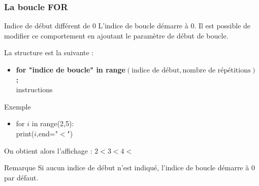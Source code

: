 \documentclass[8pt]{beamer}
\begin{document}
\begin{frame}
\frametitle{La boucle FOR}

\begin{block}{Indice de début différent de $0$}
L'indice de boucle démarre à 0. Il est possible de modifier ce comportement en ajoutant le paramètre de début de boucle.

La structure est la suivante :
\begin{itemize}
\item \textbf{for "indice de boucle" in range}$(\text{indice de début},\text{nombre de répétitions})$ \textbf{:}\\
\hspace{0.5cm} instructions\\
\end{itemize}
\end{block}

\begin{exampleblock}{Exemple}
\begin{itemize}
\item for $i$ in range(2,5):\\
\hspace{0.5cm}print($i$,end="$<$")
\end{itemize}
On obtient alors l'affichage : $2<3<4<$
\end{exampleblock}

\begin{alertblock}{Remarque}
Si aucun indice de début n'est indiqué, l'indice de boucle démarre à 0 par défaut.
\end{alertblock}

\end{frame}
\end{document}
